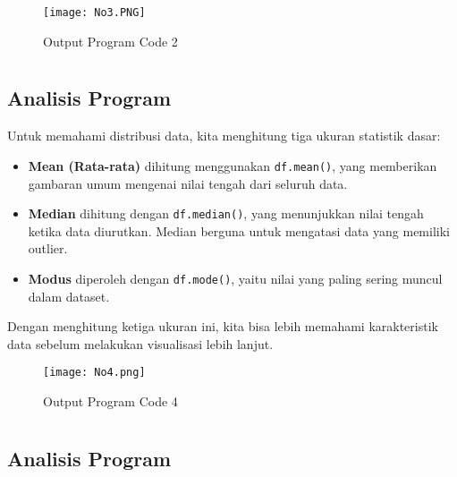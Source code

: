 \documentclass[
  course = {{Data Visualisasi dan Pemrosesan Citra}},
  assignment = 2,
  name = {{Dosen Pengampu Matkul 1 ; Dosen Pengampu Matkul 2}},
  studentnumber = {{ ; }},
  email = {{Prof. Dr. Suprijadi, M.Eng. ; Dr. Irfan Dwi Aditya, S.Si., M.Si.}},
  firstexercise = 1
]{aga-homework}
\begin{document}
\exercise
\nolinenumbers
    
\linenumbers

\begin{figure}[h!]
    \centering
    \texttt{[image: No3.PNG]}
    \caption{Output Program Code 2}
    \label{fig:enter-label}
\end{figure}
\section{}
\subsection{Analisis Program}

Untuk memahami distribusi data, kita menghitung tiga ukuran statistik dasar:

\begin{itemize}
    \item \textbf{Mean (Rata-rata)} dihitung menggunakan \texttt{df.mean()}, yang memberikan gambaran umum mengenai nilai tengah dari seluruh data.
    \item \textbf{Median} dihitung dengan \texttt{df.median()}, yang menunjukkan nilai tengah ketika data diurutkan. Median berguna untuk mengatasi data yang memiliki outlier.
    \item \textbf{Modus} diperoleh dengan \texttt{df.mode()}, yaitu nilai yang paling sering muncul dalam dataset.
\end{itemize}

Dengan menghitung ketiga ukuran ini, kita bisa lebih memahami karakteristik data sebelum melakukan visualisasi lebih lanjut. 

\exercise

\nolinenumbers
    
\linenumbers

\begin{figure}[h!]
    \centering
    \texttt{[image: No4.png]}
    \caption{Output Program Code 4}
    \label{fig:enter-label}
\end{figure}
\section{}
\subsection{Analisis Program}
\end{document}
